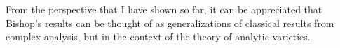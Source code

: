 \documentclass{article}
\newcommand{\nat}{\ensuremath{ \mathbb N }}
\newcommand{\co}{\ensuremath{\mathbb C }}
\newcommand{\con}{\ensuremath{\mathbb{C}^n}}
\begin{document}
%

\noindent From the perspective that I have shown so far, it can be appreciated that Bishop's results can be thought of as generalizations of classical results from complex analysis, but in the context of the theory of analytic varieties.
\end{document}
